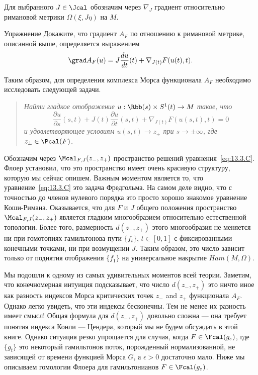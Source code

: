 Для выбранного $J\in\Jcal$ обозначим через $\nabla_{J}$ градиент
относительно римановой метрики $\Omega(\xi,J\eta)$ на $M$.
\begin{ex}{Упражнение}\label{13.3.B}
  Докажите, что градиент $A_{F}$ по отношению к римановой метрике,
  описанной выше, определяется выражением 
  \[
  \grad A_{F}(u)=J\frac{\d u}{\d t}(t)+\nabla_{J(t)}F(u(t),t).
  \]
\end{ex}
Таким образом, для определения комплекса Морса функционала $A_{F}$
необходимо исследовать  следующей задачи.
\begin{quote}\em
  Найти гладкое отображение $u : \Rbb(s)\times S^{1}(t)\to M$ такое,
  что
  \begin{equation}\label{eq:13.3.C}
    \frac{\partial u}{\partial s}(s,t) +
    J(t)\frac{\partial u}{\partial t}(s,t) +
    \nabla_{J(t)}F(u(s,t),t) = 0
  \end{equation}
  и удовлетворяющее условиям $u(s,t)\to z_{\pm}$ при $s\to\pm\infty$,
  где $z_{\pm}\in\Pcal(F)$.
\end{quote}
Обозначим через $\Mcal_{F,J}(z_{-},z_{+})$ пространство решений
уравнения~\ref{eq:13.3.C}. 
Флоер установил, что это пространство имеет очень красивую структуру,
которую мы сейчас опишем.
Важным моментом является то, что уравнение~\ref{eq:13.3.C} это задача Фредгольма.
На самом деле видно, что с точностью до членов нулевого порядка это
просто хорошо знакомое уравнение Коши-Римана. 
Оказывается, что для $F$ и $J$ общего положения пространство
$\Mcal_{F,J}(z_{-},z_{+})$ является гладким многообразием относительно
естественной топологии. 
Более того, размерность $d(z_{-}, z_{+})$ этого многообразия не
меняется ни при гомотопиях гамильтонова пути $\{f_{t}\}$, $t\in [0,1]$
с фиксированными конечными точками, ни при возмущении $J$.
Таким образом, это число зависит только от поднятия отображения
$\{f_{1}\}$ на универсальное накрытие $Ham(M, \Omega)$.

Мы подошли к одному из самых удивительных моментов всей теории.
Заметим, что конечномерная интуиция подсказывает, что число $d(z_{-},
z_{+})$ это ничто иное как разность индексов Морса критических точек
$z_{-}$ and $z_{+}$ функционала $A_{F}$.
Однако легко увидеть, что эти индексы бесконечны.
Тем не менее их разность имеет смысл!
Общая формула для
$d(z_{-},z_{+})$ довольно сложна --- она требует понятия индекса
Конли --- Цендера, который мы не будем обсуждать в этой книге.
Однако ситуация резко упрощается для случая, когда
$F\in\Fcal(g_{\epsilon})$, где $\{g_{t}\}$ это некоторый гамильтонов
поток, порожденный нормализованной, не зависящей от времени функцией
Морса $G$, а $\epsilon>0$ достаточно мало.
Ниже мы описываем гомологии Флоера для гамильтонианов
$F\in\Fcal(g_{\epsilon})$.

